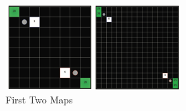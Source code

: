 \begin{figure}[htb]
    \centering
    \includegraphics[width=0.6\textwidth]{images/first_two_maps.png}
    \caption{First Two Maps}
    \label{figure:first_two_maps}
\end{figure}